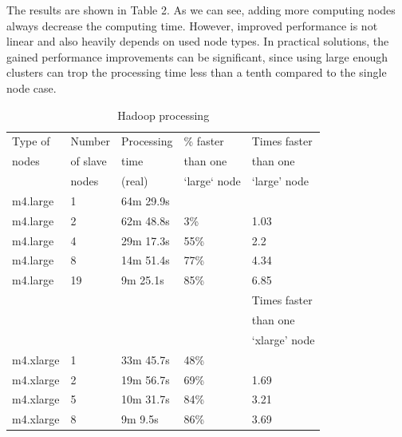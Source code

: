 \documentclass[USenglish,twocolumn]{article}
\begin{document}
The results are shown in Table 2. As we can see, adding more computing
nodes always decrease the computing time. However, improved performance
is not linear and also heavily depends on used node types. In practical
solutions, the gained performance improvements can be significant, since
using large enough clusters can trop the processing time less than a
tenth compared to the single node case.

\begin{table}[]
\begin{tabular}{lllll}
Type of       & Number      & Processing      & \% faster        & Times faster                        \\
nodes         & of slave    & time            & than one         & than one                            \\
              & nodes       & (real)          & ‘large‘ node     & ‘large’ node                        \\
\midrule
m4.large      & 1           & 64m 29.9s       &                  &                                     \\
m4.large      & 2           & 62m 48.8s       & 3\%              & 1.03                                \\
m4.large      & 4           & 29m 17.3s       & 55\%             & 2.2                                 \\
m4.large      & 8           & 14m 51.4s       & 77\%             & 4.34                                \\
m4.large      & 19          & 9m 25.1s        & 85\%             & 6.85                                \\
              &             &                 &                  & Times faster\\
              &             &                 &                  & than one\\
              &             &                 &                  & ‘xlarge’ node \\
m4.xlarge     & 1           & 33m 45.7s       & 48\%             &                                     \\
m4.xlarge     & 2           & 19m 56.7s       & 69\%             & 1.69                                \\
m4.xlarge     & 5           & 10m 31.7s       & 84\%             & 3.21                                \\
m4.xlarge     & 8           & 9m 9.5s         & 86\%             & 3.69                               \\
\end{tabular}
\caption{\label{table2}Hadoop processing}
\end{table}
\end{document}
